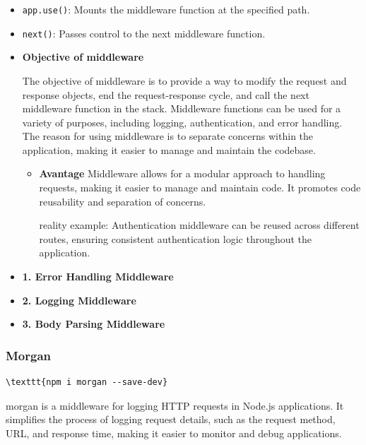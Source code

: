 \begin{itemize}
  \item \texttt{app.use()}: Mounts the middleware function at the specified path.
  \item \texttt{next()}: Passes control to the next middleware function.

  \item \textbf{Objective of middleware}

    The objective of middleware is to provide a way to modify the request and response objects, end the request-response cycle, and call the next middleware function in the stack. Middleware functions can be used for a variety of purposes, including logging, authentication, and error handling.
    The reason for using middleware is to separate concerns within the application, making it easier to manage and maintain the codebase.

    \begin{itemize}
        \item \textbf{Avantage} 
            Middleware allows for a modular approach to handling requests, making it easier to manage and maintain code.
            It promotes code reusability and separation of concerns.

            reality example: Authentication middleware can be reused across different routes, ensuring consistent authentication logic throughout the application.

    \end{itemize}


  \item \textbf{1. Error Handling Middleware}

  \item \textbf{2. Logging Middleware}

  \item \textbf{3. Body Parsing Middleware}

\end{itemize}

\subsubsection{Morgan}
\begin{verbatim}
\texttt{npm i morgan --save-dev}
\end{verbatim}

morgan is a middleware for logging HTTP requests in Node.js applications. It simplifies the process of logging request details, such as the request method, URL, and response time, making it easier to monitor and debug applications.

